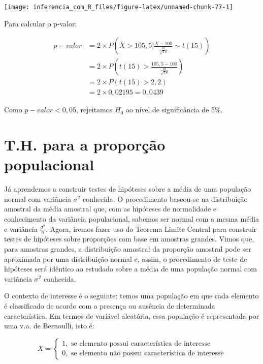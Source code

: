 \documentclass[
]{book}
\begin{document}
\begin{center}\texttt{[image: inferencia\_com\_R\_files/figure-latex/unnamed-chunk-77-1]} \end{center}

Para calcular o p-valor:

\[
\begin{aligned}
p-valor &= 2\times P\left(\bar X>105,5 \Big| \frac{\bar X-100}{\frac{10}{\sqrt 16}} \sim t(15)\right)\\
&= 2\times P\left(t(15)>\frac{105,5-100}{\frac{10}{\sqrt 16}}\right)\\
&= 2\times P\left(t(15)>2,2\right)\\
&= 2\times 0, 02195 = 0, 0439
\end{aligned}
\]

Como \(p-valor < 0,05\), rejeitamos \(H_0\) ao nível de significância de 5\%.

\hypertarget{t.h.-para-a-proporuxe7uxe3o-populacional}{%
\section{T.H. para a proporção populacional}\label{t.h.-para-a-proporuxe7uxe3o-populacional}}

Já aprendemos a construir testes de hipóteses sobre a média de uma população normal com variância \(\sigma^2\) conhecida. O procedimento baseou-se na distribuição amostral da média amostral que, com as hipóteses de normalidade e conhecimento da variância populacional, sabemos ser normal com a mesma média e variância \(\frac{\sigma^2}{n}\). Agora, iremos fazer uso do Teorema Limite Central para construir testes de hipóteses sobre proporções com base em amostras grandes. Vimos que, para amostras grandes, a distribuição amostral da proporção amostral pode ser aproximada por uma distribuição normal e, assim, o procedimento de teste de hipóteses será idêntico ao estudado sobre a média de uma população normal com variância \(\sigma^2\) conhecida.

O contexto de interesse é o seguinte: temos uma população em que cada elemento é classificado de acordo com a presença ou ausência de determinada característica. Em termos de variável aleatória, essa população é representada por uma v.a. de Bernoulli, isto é:

\[
X=\begin{cases}
1,\text{  se elemento possui característica de interesse}\\
0,\text{  se elemento não possui característica de interesse}
\end{cases}
\]
\end{document}
